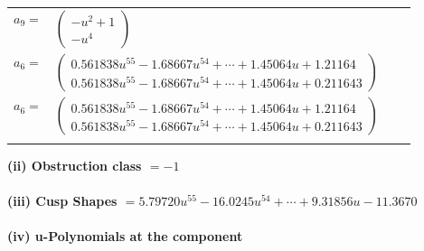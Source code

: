 \documentclass[1p]{elsarticle_modified}
\theoremstyle{definition}
\begin{document}
\begin{tabular}{m{7pt} m{180pt} m{7pt} m{180pt} }
\flushright $a_{9}=$&$\begin{pmatrix}- u^2+1\\- u^4\end{pmatrix}$ \\
\flushright $a_{6}=$&$\begin{pmatrix}0.561838 u^{55}-1.68667 u^{54}+\cdots+1.45064 u+1.21164\\0.561838 u^{55}-1.68667 u^{54}+\cdots+1.45064 u+0.211643\end{pmatrix}$\\ \flushright $a_{6}=$&$\begin{pmatrix}0.561838 u^{55}-1.68667 u^{54}+\cdots+1.45064 u+1.21164\\0.561838 u^{55}-1.68667 u^{54}+\cdots+1.45064 u+0.211643\end{pmatrix}$\\&\end{tabular}
\flushleft \textbf{(ii) Obstruction class $= -1$}\\~\\
\flushleft \textbf{(iii) Cusp Shapes $= 5.79720 u^{55}-16.0245 u^{54}+\cdots+9.31856 u-11.3670$}\\~\\
\newpage\renewcommand{\arraystretch}{1}
\flushleft \textbf{(iv) u-Polynomials at the component}\newline \\
\end{document}

